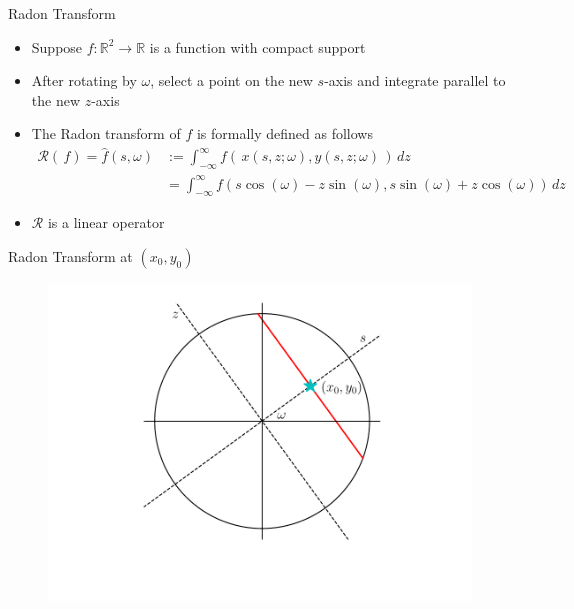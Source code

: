\documentclass{beamer}
\begin{document}
\begin{frame}{Radon Transform}
\begin{itemize}
    \item
        Suppose $f: \mathbb{R}^{2} \rightarrow \mathbb{R}$ is a function with compact support %
    \item
        After rotating by $\omega$, select a point on the new $s$-axis and integrate parallel to the new $z$-axis
    \item
        The Radon transform of $f$ is formally defined as follows
    \begin{align*}
        \mathcal{R}(\,f) = \widehat{f}(s, \omega) & := \int_{-\infty}^{\infty} f(\,x(s, z;\omega), y(s, z;\omega)\,) \, dz \\
                              & = \int_{-\infty}^{\infty} f(s \cos (\omega) - z \sin (\omega), s \sin (\omega) + z \cos (\omega)) \, dz
    \end{align*}
    \item $\mathcal{R}$ is a linear operator
\end{itemize}
\end{frame}


\begin{frame}{Radon Transform at $(x_0, y_0)$}
	\begin{figure}[H]
		\centering
		\includegraphics[scale=0.65]{figures/Radon.pdf}
	\end{figure}
\end{frame}
\end{document}
